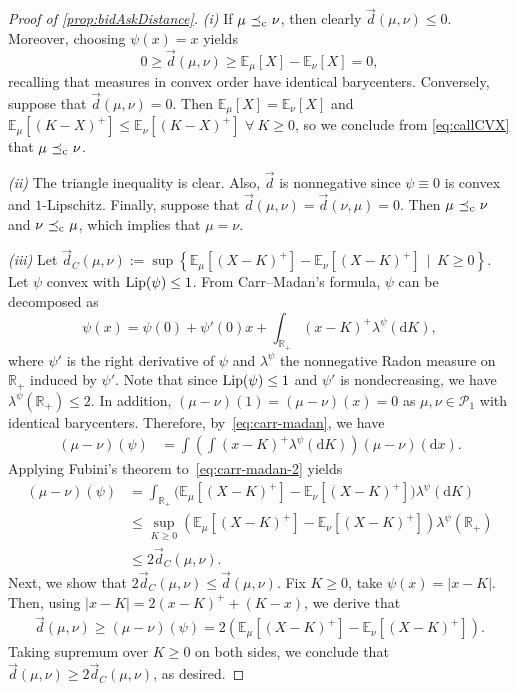 \documentclass[11pt]{article}
\newcommand{\cP}{\mathcal{P}}
\newcommand{\R}{\mathbb{R}} %
\theoremstyle{plain}
\theoremstyle{definition}
\theoremstyle{remark}
\newcommand{\E}{\mathbb{E}}
\newcommand*{\rd}{\mathrm{d}}
\DeclareMathOperator{\cleq}{\,\preceq_{\rm c}\,}
\theoremstyle{plain}
\begin{document}
\begin{proof}[Proof of \cref{prop:bidAskDistance}]\label{proof:bidAskProp}
        \textit{(i)} If $\mu \cleq \nu$, then clearly $\vec{d}(\mu,\nu) \le 0$. Moreover, choosing $\psi(x) = x$ yields
    $$0 \ge \vec{d}(\mu,\nu) \ge \E_{\mu}[X] - \E_{\nu}[X] = 0,$$ 
    recalling that measures in convex order have identical barycenters. %
    Conversely, suppose that $\vec{d}(\mu,\nu) = 0$. Then 
    $\E_\mu[X] = \E_\nu[X]$ and $\E_\mu[(K-X)^+] \leq \E_\nu[(K-X)^+]$  $\forall \ K\ge 0$, so we  conclude from \eqref{eq:callCVX} that $\mu \cleq \nu$. 

\textit{(ii)} The triangle inequality is clear. Also, $\vec{d}$ is nonnegative since $\psi\equiv 0$ is convex and $1$-Lipschitz.  Finally, suppose that $\vec{d}(\mu,\nu) = \vec{d}(\nu,\mu) = 0$. Then $\mu \cleq \nu$ and $\nu \cleq \mu$, which implies that $\mu = \nu$. 


\textit{(iii)} 
Let $\vec{d}_C(\mu,\nu) := \sup \left\{\E_{\mu}[(X-K)^+]-\E_{\nu}[(X-K)^+] \, \mid \, K\ge 0 \right\}$. Let $\psi$ convex with $\textnormal{Lip}(\psi) \le 1$. From Carr--Madan's formula, $\psi$ can be decomposed as  
\begin{equation}\label{eq:carr-madan}
    \psi(x) = \psi(0) + \psi'(0) x + \int_{\R_+}(x-K)^+ \lambda^{\psi}(\rd K), 
\end{equation}
where $\psi'$ is the right derivative of $\psi$ and $\lambda^{\psi}$  the nonnegative Radon measure on $\R_+$ induced by $\psi'$. Note that since $\textnormal{Lip}(\psi) \leq 1$ and $\psi'$ is nondecreasing, we have $\lambda^\psi(\R_+) \leq 2$. In addition, $(\mu-\nu)(1) = (\mu-\nu)(x) =0$ as $\mu,\nu\in\cP_1$ with identical barycenters. Therefore, by~\eqref{eq:carr-madan}, we have
\begin{equation}\label{eq:carr-madan-2}
    \begin{aligned}
       (\mu-\nu)(\psi) & = \int \left(\int (x-K)^+ \lambda^\psi(\rd K)\right)(\mu -\nu)(\rd x).
    \end{aligned}
\end{equation}
Applying Fubini's theorem to~\eqref{eq:carr-madan-2} yields 
\begin{equation*}
\begin{aligned}
        (\mu-\nu)(\psi) &= \int_{\R_+} \big(\E_{\mu}[(X-K)^+] - \E_{\nu}[(X-K)^+] \big) \lambda^{\psi}(\rd K) \\
        & \leq \sup_{K\geq 0} \left(\E_{\mu}[(X-K)^+] - \E_{\nu}[(X-K)^+] \right) \lambda^{\psi}(\R_+) \\
        & \leq 2\vec{d}_C(\mu,\nu).
\end{aligned}
\end{equation*}
Next, we show that $2\vec{d}_C(\mu,\nu) \le \vec{d}(\mu,\nu)$. Fix $K\geq 0$, take $\psi(x) = |x-K|$. Then, using $|x-K| = 2(x-K)^+ + (K-x)$, we derive that
\begin{align*}
     \vec{d}(\mu,\nu) \geq (\mu-\nu)(\psi) = 2\left(\E_{\mu}[(X-K)^+] - \E_{\nu}[(X-K)^+] \right).
\end{align*}
Taking supremum over $K\geq 0$ on both sides, we conclude that $ \vec{d}(\mu,\nu) \geq 2\vec{d}_C(\mu,\nu)$, as desired.




\end{proof}
\end{document}
